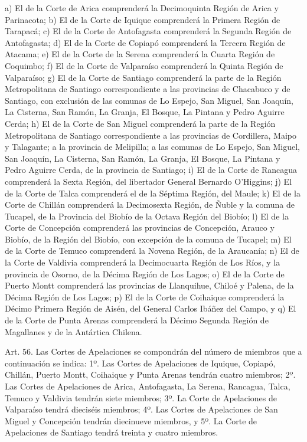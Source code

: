     a) El de la Corte de Arica comprenderá la Decimoquinta Región de Arica y Parinacota;
    b) El de la Corte de Iquique comprenderá la Primera Región de Tarapacá;
    c) El de la Corte de Antofagasta comprenderá la Segunda Región de Antofagasta;
    d) El de la Corte de Copiapó comprenderá la Tercera Región de Atacama;
    e) El de la Corte de la Serena comprenderá la Cuarta Región de Coquimbo;
    f) El de la Corte de Valparaíso comprenderá la Quinta Región de Valparaíso;
    g) El de la Corte de Santiago comprenderá la parte de la Región Metropolitana de Santiago correspondiente a las provincias de Chacabuco y de Santiago, con exclusión de las comunas de Lo Espejo, San Miguel, San Joaquín, La Cisterna, San Ramón, La Granja, El Bosque, La Pintana y Pedro Aguirre Cerda;
    h) El de la Corte de San Miguel comprenderá la parte de la Región Metropolitana de Santiago correspondiente a las provincias de Cordillera, Maipo y Talagante; a la provincia de Melipilla; a las comunas de Lo Espejo, San Miguel, San Joaquín, La Cisterna, San Ramón, La Granja, El Bosque, La Pintana y Pedro Aguirre Cerda, de la provincia de Santiago;
    i) El de la Corte de Rancagua comprenderá la Sexta Región, del libertador General Bernardo O'Higgins;
    j) El de la Corte de Talca comprenderá el de la Séptima Región, del Maule;
    k) El de la Corte de Chillán comprenderá la Decimosexta Región, de Ñuble y la comuna de Tucapel, de la Provincia del Biobío de la Octava Región del Biobío;
    l) El de la Corte de Concepción comprenderá las provincias de Concepción, Arauco y Biobío, de la Región del Biobío, con excepción de la comuna de Tucapel;
    m) El de la Corte de Temuco comprenderá la Novena Región, de la Araucanía;
    n) El de la Corte de Valdivia comprenderá la Decimocuarta Región de Los Ríos, y la provincia de Osorno, de la Décima Región de Los Lagos;
    o) El de la Corte de Puerto Montt comprenderá las provincias de Llanquihue, Chiloé y Palena, de la Décima Región de Los Lagos;
    p) El de la Corte de Coihaique comprenderá la Décimo Primera Región de Aisén, del General Carlos Ibáñez del Campo, y
    q) El de la Corte de Punta Arenas comprenderá la Décimo Segunda Región de Magallanes y de la Antártica Chilena.




    Art. 56. Las Cortes de Apelaciones se compondrán del número de miembros que a continuación se indica:
    1º. Las Cortes de Apelaciones de Iquique, Copiapó, Chillán, Puerto Montt, Coihaique y Punta Arenas tendrán cuatro miembros;
    2º. Las Cortes de Apelaciones de Arica, Antofagasta, La Serena, Rancagua, Talca, Temuco y Valdivia tendrán siete miembros;
    3º. La Corte de Apelaciones de Valparaíso tendrá dieciséis miembros;
    4º. Las Cortes de Apelaciones de San Miguel y Concepción tendrán diecinueve miembros, y
    5º. La Corte de Apelaciones de Santiago tendrá treinta y cuatro miembros.



